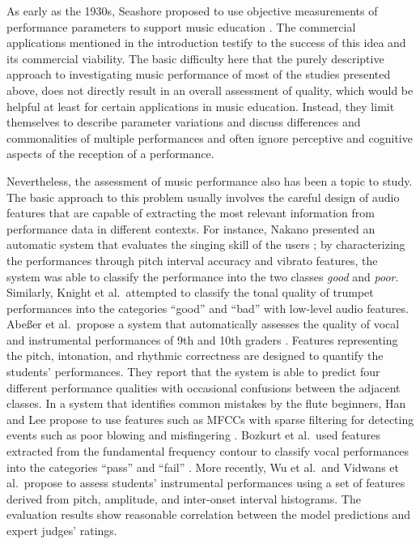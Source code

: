 \documentclass{ws-ijsc}
\begin{document}
As early as the 1930s, Seashore proposed to use objective measurements of performance parameters to support music education \cite{seashore_psychology_1938}. The commercial applications mentioned in the introduction testify to the success of this idea and its commercial viability. The basic difficulty here that the purely descriptive approach to investigating music performance of most of the studies presented above, does not directly result in an overall assessment of quality, which would be helpful at least for certain applications in music education. Instead, they limit themselves to describe parameter variations and discuss differences and commonalities of multiple performances and often ignore perceptive and cognitive aspects of the reception of a performance. 

Nevertheless, the assessment of music performance also has been a topic to study. The basic approach to this problem usually involves the careful design of audio features that are capable of extracting the most relevant information from performance data in different contexts. For instance, Nakano presented an automatic system that evaluates the singing skill of the users \cite{Nakano2006a}; by characterizing the performances through pitch interval accuracy and vibrato features, the system was able to classify the performance into the two classes \textit{good} and \textit{poor}.  Similarly, Knight et al.\ attempted to classify the tonal quality of trumpet performances into the categories ``good'' and ``bad'' with low-level audio features.
Abe{\ss}er et al.\ propose a system that automatically assesses the quality of vocal and instrumental performances of 9th and 10th graders \cite{Abeßer2013}. Features representing the pitch, intonation, and rhythmic correctness are designed to quantify the students' performances. They report that the system is able to predict four different performance qualities with occasional confusions between the adjacent classes. 
In a system that identifies common mistakes by the flute beginners, Han and Lee propose to use features such as MFCCs with sparse filtering for detecting events such as poor blowing and misfingering \cite{Han2014}. Bozkurt et al.\ used features extracted from the fundamental frequency contour to classify vocal performances into the categories ``pass'' and ``fail'' \cite{bozkurt_dataset_2017}.
More recently, Wu et al.\  and Vidwans et al.\ propose to assess students' instrumental performances using a set of features derived from pitch, amplitude, and inter-onset interval histograms\cite{Wu2016,Vidwans2017}. The evaluation results show reasonable correlation between the model predictions and expert judges' ratings. 
\end{document}
